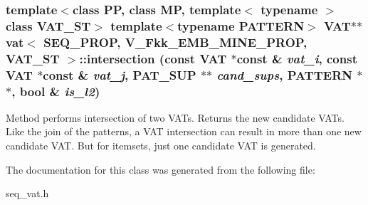 \subsubsection{\setlength{\rightskip}{0pt plus 5cm}template$<$class PP, class MP, template$<$ typename $>$ class VAT\_\-ST$>$ template$<$typename PATTERN$>$ {\bf VAT}$\ast$$\ast$ {\bf vat}$<$ SEQ\_\-PROP, V\_\-Fkk\_\-EMB\_\-MINE\_\-PROP, VAT\_\-ST $>$::intersection (const {\bf VAT} $\ast$const \& {\em vat\_\-i}, const {\bf VAT} $\ast$const \& {\em vat\_\-j}, {\bf PAT\_\-SUP} $\ast$$\ast$ {\em cand\_\-sups}, PATTERN $\ast$$\ast$, bool \& {\em is\_\-l2})\hspace{0.3cm}{\tt  [inline, static]}}\label{classvat_3_01SEQ__PROP_00_01V__Fkk__EMB__MINE__PROP_00_01VAT__ST_01_4_e0}


Method performs intersection of two VATs. Returns the new candidate VATs. Like the join of the patterns, a VAT intersection can result in more than one new candidate VAT. But for itemsets, just one candidate VAT is generated. 

The documentation for this class was generated from the following file:\begin{CompactItemize}
\item 
seq\_\-vat.h\end{CompactItemize}

